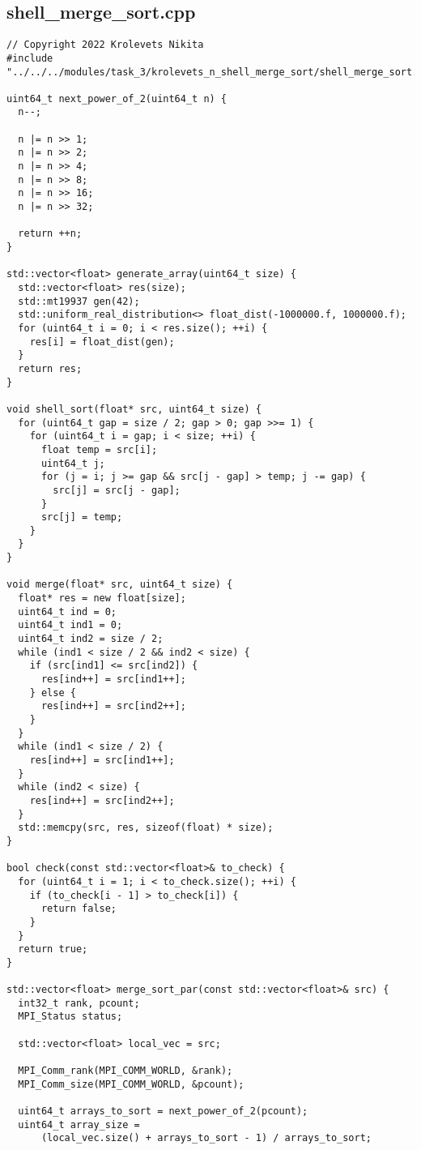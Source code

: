 \documentclass[14pt, a4paper]{extarticle}
\begin{document}
	\subsection{shell\_merge\_sort.cpp}
	\begin{lstlisting}
// Copyright 2022 Krolevets Nikita
#include "../../../modules/task_3/krolevets_n_shell_merge_sort/shell_merge_sort.h"

uint64_t next_power_of_2(uint64_t n) {
  n--;

  n |= n >> 1;
  n |= n >> 2;
  n |= n >> 4;
  n |= n >> 8;
  n |= n >> 16;
  n |= n >> 32;

  return ++n;
}

std::vector<float> generate_array(uint64_t size) {
  std::vector<float> res(size);
  std::mt19937 gen(42);
  std::uniform_real_distribution<> float_dist(-1000000.f, 1000000.f);
  for (uint64_t i = 0; i < res.size(); ++i) {
    res[i] = float_dist(gen);
  }
  return res;
}

void shell_sort(float* src, uint64_t size) {
  for (uint64_t gap = size / 2; gap > 0; gap >>= 1) {
    for (uint64_t i = gap; i < size; ++i) {
      float temp = src[i];
      uint64_t j;
      for (j = i; j >= gap && src[j - gap] > temp; j -= gap) {
        src[j] = src[j - gap];
      }
      src[j] = temp;
    }
  }
}

void merge(float* src, uint64_t size) {
  float* res = new float[size];
  uint64_t ind = 0;
  uint64_t ind1 = 0;
  uint64_t ind2 = size / 2;
  while (ind1 < size / 2 && ind2 < size) {
    if (src[ind1] <= src[ind2]) {
      res[ind++] = src[ind1++];
    } else {
      res[ind++] = src[ind2++];
    }
  }
  while (ind1 < size / 2) {
    res[ind++] = src[ind1++];
  }
  while (ind2 < size) {
    res[ind++] = src[ind2++];
  }
  std::memcpy(src, res, sizeof(float) * size);
}

bool check(const std::vector<float>& to_check) {
  for (uint64_t i = 1; i < to_check.size(); ++i) {
    if (to_check[i - 1] > to_check[i]) {
      return false;
    }
  }
  return true;
}

std::vector<float> merge_sort_par(const std::vector<float>& src) {
  int32_t rank, pcount;
  MPI_Status status;

  std::vector<float> local_vec = src;

  MPI_Comm_rank(MPI_COMM_WORLD, &rank);
  MPI_Comm_size(MPI_COMM_WORLD, &pcount);

  uint64_t arrays_to_sort = next_power_of_2(pcount);
  uint64_t array_size =
      (local_vec.size() + arrays_to_sort - 1) / arrays_to_sort;


\end{lstlisting}
\end{document}
